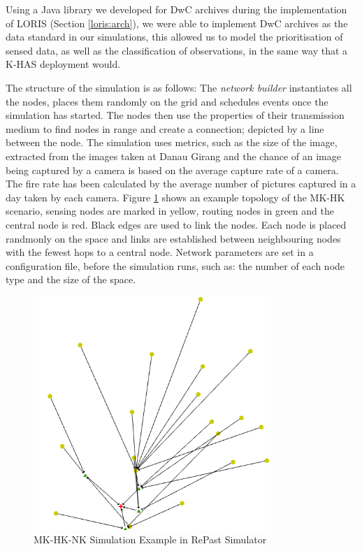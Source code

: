 Using a Java library we developed for DwC archives during the implementation of LORIS (Section \ref{loris:arch}), we were able to implement DwC archives as the data standard in our simulations, this allowed us to model the prioritisation of sensed data, as well as the classification of observations, in the same way that a K-HAS deployment would.

The structure of the simulation is as follows: The \textit{network builder} instantiates all the nodes, places them randomly on the grid and schedules events once the simulation has started. The nodes then use the properties of their transmission medium to find nodes in range and create a connection; depicted by a line between the node. The simulation uses metrics, such as the size of the image, extracted from the images taken at Danau Girang and the chance of an image being captured by a camera is based on the average capture rate of a camera. The fire rate has been calculated by the average number of pictures captured in a day taken by each camera. Figure \ref{fig:sim} shows an example topology of the MK-HK scenario, sensing nodes are marked in yellow, routing nodes in green and the central node is red. Black edges are used to link the nodes. Each node is placed randmonly on the space and links are established between neighbouring nodes with the fewest hops to a central node. Network parameters are set in a configuration file, before the simulation runs, such as: the number of each node type and the size of the space.


	\begin{figure}[h]
	\centering
	\includegraphics[width=0.8\textwidth]{Chap7/figures/khas_sim}
	\caption{MK-HK-NK Simulation Example in RePast Simulator}
	\label{fig:sim}
	\end{figure}


